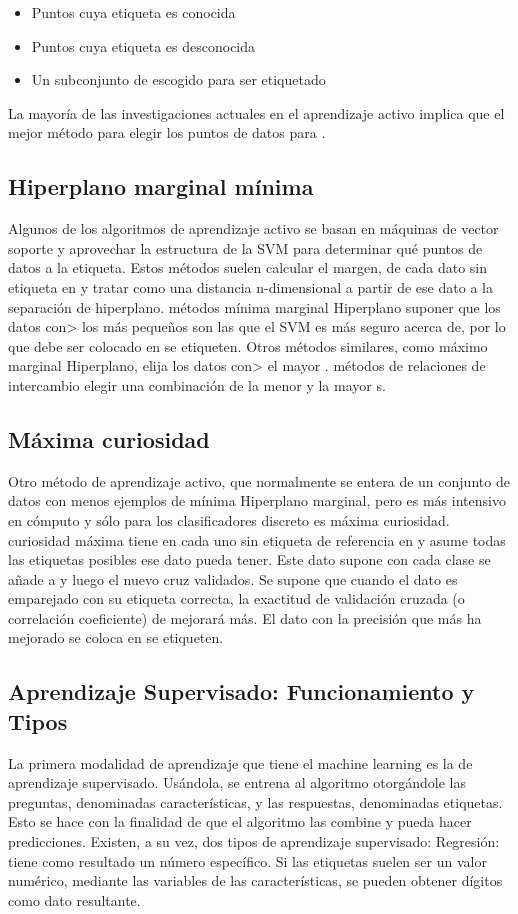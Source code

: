 \documentclass[12pt,a4paper]{report}
\begin{document}
\begin{itemize}
\item Puntos cuya etiqueta es conocida
\item Puntos cuya etiqueta es desconocida
\item Un subconjunto de  escogido para ser etiquetado
\end{itemize}

La mayoría de las investigaciones actuales en el aprendizaje activo implica que el mejor método para elegir los puntos de datos para .

\subsection{Hiperplano marginal mínima}
Algunos de los algoritmos de aprendizaje activo se basan en máquinas de vector soporte y aprovechar la estructura de la SVM para determinar qué puntos de datos a la etiqueta. Estos métodos suelen calcular el margen, de cada dato sin etiqueta en  y tratar  como una distancia n-dimensional a partir de ese dato a la separación de hiperplano.
métodos mínima marginal Hiperplano suponer que los datos con> los más pequeños  son las que el SVM es más seguro acerca de, por lo que debe ser colocado en  se etiqueten. Otros métodos similares, como máximo marginal Hiperplano, elija los datos con> el mayor . métodos de relaciones de intercambio elegir una combinación de la menor y la mayor  s.

\subsection{Máxima curiosidad}
Otro método de aprendizaje activo, que normalmente se entera de un conjunto de datos con menos ejemplos de mínima Hiperplano marginal, pero es más intensivo en cómputo y sólo para los clasificadores discreto es máxima curiosidad.
curiosidad máxima tiene en cada uno sin etiqueta de referencia en  y asume todas las etiquetas posibles ese dato pueda tener. Este dato supone con cada clase se añade a  y luego el nuevo  cruz validados. Se supone que cuando el dato es emparejado con su etiqueta correcta, la exactitud de validación cruzada (o correlación coeficiente) de  mejorará más. El dato con la precisión que más ha mejorado se coloca en  se etiqueten.

\subsection{Aprendizaje Supervisado: Funcionamiento y Tipos}
La primera modalidad de aprendizaje que tiene el machine learning es la de aprendizaje supervisado. Usándola, se entrena al algoritmo otorgándole las preguntas, denominadas características, y las respuestas, denominadas etiquetas. Esto se hace con la finalidad de que el algoritmo las combine y pueda hacer predicciones.
Existen, a su vez, dos tipos de aprendizaje supervisado:
Regresión: tiene como resultado un número específico. Si las etiquetas suelen ser un valor numérico, mediante las variables de las características, se pueden obtener dígitos como dato resultante.
\end{document}
